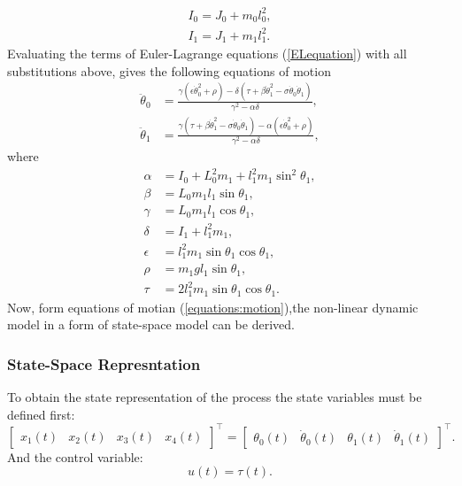 \begin{subequations}
		\begin{align}
			I_0 = J_0 + m_0l_0^2,\\
			I_1 = J_1 + m_1l_1^2.
		\end{align}
\end{subequations}
Evaluating the terms of Euler-Lagrange equations (\ref{ELequation}) with all substitutions above, gives the following equations of motion
\begin{subequations}\label{equations:motion}
	\begin{align}
	\ddot{\theta}_0 &= \frac{\gamma(\epsilon\dot{\theta}_0^2+\rho)-\delta(\tau+\beta\dot{\theta}_1^2-\sigma\dot{\theta}_0\dot{\theta}_1)}{\gamma^2-\alpha\delta}\label{motion1},\\
	\ddot{\theta}_1 &= \frac{\gamma(\tau+\beta\dot{\theta}_1^2-\sigma\dot{\theta}_0\dot{\theta}_1)-\alpha(\epsilon\dot{\theta}_0^2+\rho)}{\gamma^2-\alpha\delta}\label{motion2},
	\end{align}
\end{subequations}
where
\begin{subequations}
	\begin{align}
	\alpha &= I_0+L_0^2m_1+l_1^2m_1\sin^2\theta_1,\\
	\beta &= L_0m_1l_1\sin\theta_1, \\
	\gamma &= L_0m_1l_1\cos\theta_1,\\
	\delta &= I_1+l_1^2m_1,\\
	\epsilon &= l^2_1m_1\sin\theta_1\cos\theta_1,\\
	\rho &= m_1gl_1\sin\theta_1,\\
	\tau &= 2l^2_1m_1\sin\theta_1\cos\theta_1.
	\end{align}
\end{subequations}
Now, form equations of motian (\ref{equations:motion}),the non-linear dynamic model in a form of state-space model can be derived.
\subsubsection{State-Space Represntation} 
To obtain the state representation of the process the state variables must be defined first:
\begin{equation}
\begin{bmatrix}
x_1(t)&x_2(t)&x_3(t)&x_4(t)
\end{bmatrix}^\intercal = 
\begin{bmatrix}
\theta_0(t)&\dot{\theta}_0(t)&\theta_1(t)&\dot{\theta}_1(t)
\end{bmatrix}^\intercal.
\end{equation}
And the control variable:
\begin{equation} u(t) = \tau(t). \end{equation}

